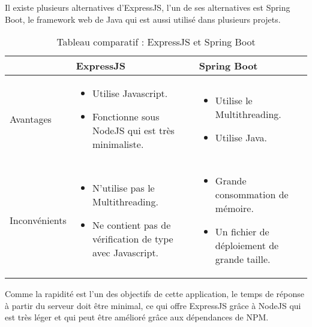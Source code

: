 Il existe plusieurs alternatives d'ExpressJS, l'un de ses alternatives est Spring Boot, le framework web de Java qui est aussi utilisé dans plusieurs projets.
\begin{table}[H]
    \begin{center}
        \begin{tabularx}{\textwidth} {
                | >{\centering\arraybackslash}X
                | >{\centering\arraybackslash}X
                | >{\centering\arraybackslash}X |}
            \hline
                          & ExpressJS                                                      & Spring Boot \\
            \hline
            Avantages     & \begin{itemize}
                                \item Utilise Javascript.
                                \item Fonctionne sous NodeJS qui est très minimaliste.
                            \end{itemize}         & \begin{itemize}
                                                        \item Utilise le Multithreading.
                                                        \item Utilise Java.
                                                    \end{itemize}                      \\
            \hline
            Inconvénients & \begin{itemize}
                                \item N'utilise pas le Multithreading.
                                \item Ne contient pas de vérification de type avec Javascript.
                            \end{itemize} & \begin{itemize}
                                                \item Grande consommation de mémoire.
                                                \item Un fichier de déploiement de grande taille.
                                            \end{itemize}             \\
            \hline
        \end{tabularx}
        \captionsetup{justification = centering}
        \caption{Tableau comparatif : ExpressJS et Spring Boot}
        \label{compare_spring_boot_expressjs}
    \end{center}
\end{table}
Comme la rapidité est l'un des objectifs de cette application, le temps de réponse à partir du serveur doit être minimal, ce qui offre ExpressJS grâce à NodeJS qui est très léger et qui peut être amélioré grâce aux dépendances de NPM.

